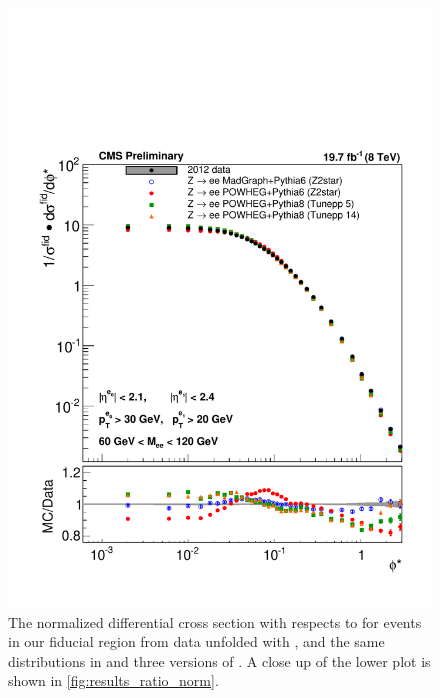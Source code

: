 \begin{figure}[!p]
    \centering
    \includegraphics[width=\textwidth]{figures/ZShape_elec_Norm_Dressed.pdf}
    \caption[
        The normalized differential cross section with respects to \phistar for
        \Ztoee events in our fiducial region from data unfolded with \MADGRAPH.
    ]{
        The normalized differential cross section with respects to \phistar for
        \Ztoee events in our fiducial region from data unfolded with \MADGRAPH,
        and the same distributions in \MADGRAPH and three versions of \POWHEG.
        A close up of the lower plot is shown in \cref{fig:results_ratio_norm}.
    }
    \label{fig:results_norm}
\end{figure}

